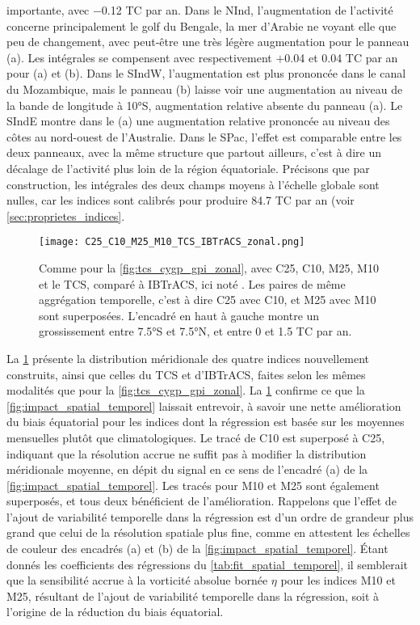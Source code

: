 \documentclass[../main.tex]{subfiles}
\begin{document}
importante, avec \num{-0.12} TC par an. Dans le NInd, l'augmentation de l'activité concerne principalement le golf du Bengale, la mer d'Arabie ne voyant elle
que peu de changement, avec peut-être une très légère augmentation pour le panneau (a). Les intégrales se compensent avec respectivement $+$\num{0.04} et
\num{0.04} TC par an pour (a) et (b). Dans le SIndW, l'augmentation est plus prononcée dans le canal du Mozambique, mais le panneau (b) laisse voir une
augmentation au niveau de la bande de longitude à \ang{10}S, augmentation relative absente du panneau (a). Le SIndE montre dans le (a) une augmentation relative
prononcée au niveau des côtes au nord-ouest de l'Australie. Dans le SPac, l'effet est comparable entre les deux panneaux, avec la même structure que partout
ailleurs, c'est à dire un décalage de l'activité plus loin de la région équatoriale. Précisons que par construction, les intégrales des deux champs moyens à
l'échelle globale sont nulles, car les indices sont calibrés pour produire \num{84.7} TC par an (voir \cref{sec:proprietes_indices}.

\begin{figure}[htb]
    \centering
    \texttt{[image: C25\_C10\_M25\_M10\_TCS\_IBTrACS\_zonal.png]}
    \caption{Comme pour la \cref{fig:tcs_cygp_gpi_zonal}, avec C25, C10, M25, M10 et le TCS, comparé à IBTrACS, ici noté . Les paires de même
    aggrégation temporelle, c'est à dire C25 avec C10, et M25 avec M10 sont superposées. L'encadré en haut à gauche montre un grossissement entre \ang{7.5}S et
    \ang{7.5}N, et entre 0 et \num{1.5} TC par an.}
    \label{fig:my_fit_meridional}
\end{figure}

La \cref{fig:my_fit_meridional} présente la distribution méridionale des quatre indices nouvellement construits, ainsi que celles du TCS et d'IBTrACS, faites
selon les mêmes modalités que pour la \cref{fig:tcs_cygp_gpi_zonal}. La \cref{fig:my_fit_meridional} confirme ce que la \cref{fig:impact_spatial_temporel}
laissait entrevoir, à savoir une nette amélioration du biais équatorial pour les indices dont la régression est basée sur les moyennes mensuelles plutôt que
climatologiques. Le tracé de C10 est superposé à C25, indiquant que la résolution accrue ne suffit pas à modifier la distribution méridionale moyenne, en dépit
du signal en ce sens de l'encadré (a) de la \cref{fig:impact_spatial_temporel}. Les tracés pour M10 et M25 sont également superposés, et tous deux bénéficient
de l'amélioration. Rappelons que l'effet de l'ajout de variabilité temporelle dans la régression est d'un ordre de grandeur plus grand que celui de la
résolution spatiale plus fine, comme en attestent les échelles de couleur des encadrés (a) et (b) de la \cref{fig:impact_spatial_temporel}. Étant donnés les
coefficients des régressions du \cref{tab:fit_spatial_temporel}, il semblerait que la sensibilité accrue à la vorticité absolue bornée $\eta$ pour les indices
M10 et M25, résultant de l'ajout de variabilité temporelle dans la régression, soit à l'origine de la réduction du biais équatorial.
\end{document}
